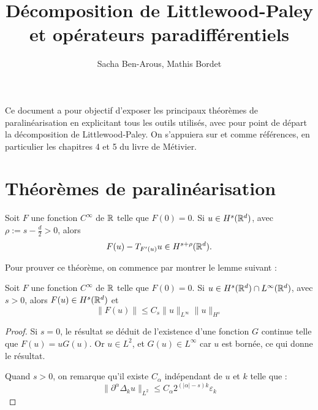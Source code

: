 \documentclass[11pt,a4paper]{article}
\title{\textbf{Décomposition de Littlewood-Paley et opérateurs paradifférentiels}}
\date{}
\author{Sacha Ben-Arous, Mathis Bordet}
\begin{document}
\maketitle

Ce document a pour objectif d'exposer les principaux théorèmes de paralinéarisation en explicitant tous les outils utilisés, avec pour point de départ la décomposition de Littlewood-Paley. On s'appuiera sur \cite{metivier} et comme \cite{dgv} références, en particulier les chapitres 4 et 5 du livre de Métivier.

\section{Théorèmes de paralinéarisation}

\begin{thm}\label{paralin}
Soit $F$ une fonction $C^{\infty}$ de $\mathbb R$ telle que $F(0)=0$. Si $u\in H^s(\mathbb R^d)$, avec $\rho := s - \frac{d}{2}>0 $, alors 
\begin{equation}
F(u) - T_{F'(u)}u \in H^{s+\rho}(\mathbb R^d).
\end{equation}
\end{thm}
Pour prouver ce théorème, on commence par montrer le lemme suivant : 

\begin{lemma}
Soit $F$ une fonction $C^{\infty}$ de $\mathbb R$ telle que $F(0)=0$. Si $u\in H^s(\mathbb R^d)\cap L^{\infty}(\mathbb R^d) $, avec $s>0 $, alors $F(u) \in H^s(\mathbb R^d)$ et 
\begin{equation}
\|F(u)\| \leq C_s \|u\|_{L^{\infty}} \|u\|_{H^s}
\end{equation}
\end{lemma}

\begin{proof}
Si $s=0$, le résultat se déduit de l'existence d'une fonction $G$ continue telle que $F(u)=uG(u)$. Or $u\in L^2$, et $G(u) \in L^{\infty}$ car $u$ est bornée, ce qui donne le résultat.
\par Quand $s>0$, on remarque qu'il existe $C_\alpha$  indépendant de $u$ et $k$ telle que  : 
\begin{equation}
\|\partial^\alpha \Delta_k u \|_{L^2} \leq C_\alpha 2^{(|\alpha|-s)k} \varepsilon_k
\end{equation}
\end{proof}


\newpage
\printbibliography[heading=bibintoc, title={Références}]
\end{document}
